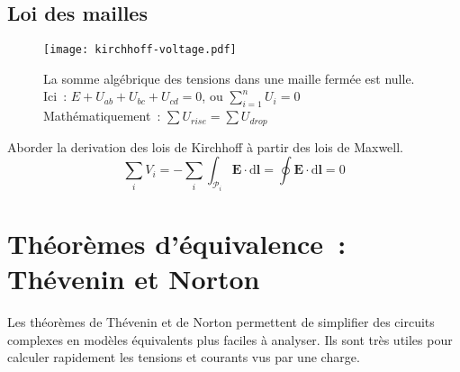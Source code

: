 \subsection{Loi des mailles} \label{subsec:mailles}
\begin{figure}[H]
    \centering
    \texttt{[image: kirchhoff-voltage.pdf]}
    \caption[Loi des mailles.]{
        La somme alg\'ebrique des tensions dans une maille ferm\'ee est nulle.\\
        Ici~: \(E+U_{ab}+U_{bc}+U_{cd}=0\), ou \(\displaystyle\sum_{i=1}^nU_i=0\)\\
        \vspace{\baselineskip}
        Math\'ematiquement~: \(\displaystyle\sum U_{rise} = \displaystyle\sum U_{drop}\)
    }
    \label{fig:kirchhoff-voltage}%
\end{figure}
\begin{Todo}
	Aborder la derivation des lois de Kirchhoff \`a partir des lois de Maxwell.
	\[\sum_i V_i = - \sum_i \int_{\mathcal{P}_i}\mathbf{E}\cdot\mathrm{d}\mathbf{l} = \oint\mathbf{E}\cdot\mathrm{d}\mathbf{l} = 0\]
\end{Todo}

\section{Th\'eor\`emes d'\'equivalence~: Th\'evenin et Norton} \label{subsec:thevenin_norton}
Les th\'eor\`emes de Th\'evenin et de Norton permettent de simplifier des circuits complexes en mod\`eles \'equivalents plus faciles à analyser. Ils sont tr\`es utiles pour calculer rapidement les tensions et courants vus par une charge.

